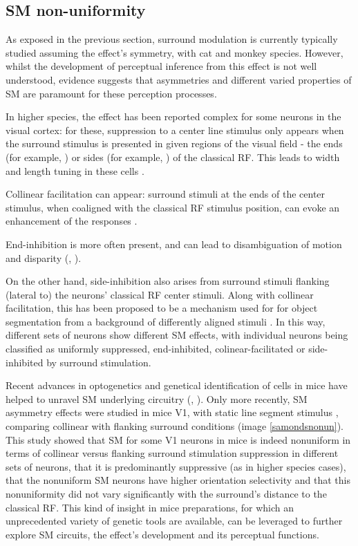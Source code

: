 \subsection{SM non-uniformity}

As exposed in the previous section, surround modulation is currently typically studied assuming the effect's symmetry, with cat and monkey species. However, whilst the development of perceptual inference from this effect is not well understood, evidence suggests that asymmetries and different varied properties of SM are paramount for these perception processes.

In higher species, the effect has been reported complex for some neurons in the visual cortex: for these, suppression to a center line stimulus only appears when the surround stimulus is presented in given regions of the visual field - the ends (for example, \cite{Dreher1972}) or sides (for example, \cite{Born1991}) of the classical RF. This leads to width and length tuning in these cells \cite{DeAngelis1994}.

Collinear facilitation can appear: surround stimuli at the ends of the center stimulus, when coaligned with the classical RF stimulus position, can evoke an enhancement of the responses \cite{Kapadia1995}.

End-inhibition is more often present, and can lead to disambiguation of motion and disparity (\cite{Heitger1992}, \cite{Barth2000}). 

On the other hand, side-inhibition also arises from surround stimuli flanking (lateral to) the neurons' classical RF center stimuli. Along with collinear facilitation, this has been proposed to be a mechanism used for for object segmentation from a background of differently aligned stimuli \cite{Kapadia1995}. In this way, different sets of neurons show different SM effects, with individual neurons being classified as uniformly suppressed, end-inhibited, colinear-facilitated or side-inhibited by surround stimulation.

Recent advances in optogenetics and genetical identification of cells in mice have helped to unravel SM underlying circuitry (\cite{Adesnik2012}, \cite{Self2014}). 
Only more recently, SM asymmetry effects were studied in mice V1, with static line segment stimulus \cite{Samonds2017}, comparing collinear with flanking surround conditions (image \ref{samondsnonun}). This study showed that SM  for some V1 neurons in mice is indeed nonuniform in terms of collinear versus flanking surround stimulation suppression in different sets of neurons, that it is predominantly suppressive (as in higher species cases), that the nonuniform SM neurons have higher orientation selectivity and that this nonuniformity did not vary significantly with the surround's distance to the classical RF. This kind of insight in mice preparations, for which an unprecedented variety of genetic tools are available, can be leveraged to further explore SM circuits, the effect's development and its perceptual functions.


